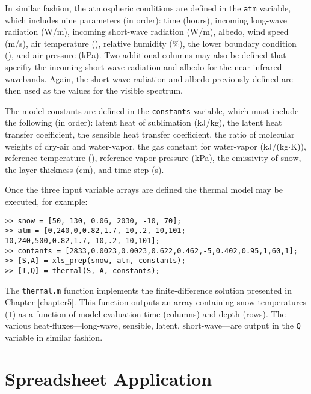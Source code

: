 In similar fashion, the atmospheric conditions are defined in the \texttt{atm} variable, which includes nine parameters (in order): time (hours), incoming long-wave radiation (W/m), incoming short-wave radiation (W/m), albedo, wind speed (m/s), air temperature (\C), relative humidity (\%), the lower boundary condition (\C), and air pressure (kPa).  Two additional columns may also be defined that specifiy the incoming short-wave radiation and albedo for the near-infrared wavebands.  Again, the short-wave radiation and albedo previously defined are then used as the values for the visible spectrum.

The model constants are defined in the \texttt{constants} variable, which must include the following (in order): latent heat of sublimation (kJ/kg), the latent heat transfer coefficient, the sensible heat transfer coefficient, the ratio of molecular weights of dry-air and water-vapor, the gas constant for water-vapor (kJ/(kg$\cdot$K)), reference temperature (\C), reference vapor-pressure (kPa), the emissivity of snow, the layer thickness (cm), and time step (s).

Once the three input variable arrays are defined the thermal model may be executed, for example:
\begin{singlespaced}\begin{lstlisting}[style=inline]
>> snow = [50, 130, 0.06, 2030, -10, 70];
>> atm = [0,240,0,0.82,1.7,-10,.2,-10,101; 10,240,500,0.82,1.7,-10,.2,-10,101];
>> contants = [2833,0.0023,0.0023,0.622,0.462,-5,0.402,0.95,1,60,1];
>> [S,A] = xls_prep(snow, atm, constants);
>> [T,Q] = thermal(S, A, constants); 
\end{lstlisting}\end{singlespaced}

The \texttt{thermal.m} function implements the finite-difference solution presented in Chapter \ref{chapter5}.  This function outputs an array containing snow temperatures (\texttt{T}) as a function of model evaluation time (columns) and depth (rows).  The various heat-fluxes---long-wave, sensible, latent, short-wave---are output in the \texttt{Q} variable in similar fashion.

\section{Spreadsheet Application}\label{TM:sec:spread}
